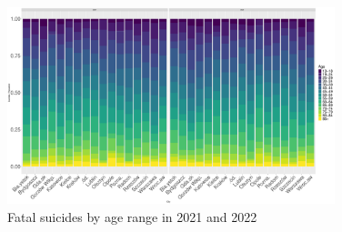 \documentclass{article}
\begin{document}
\begin{figure}[H]
    \centering
    \includegraphics[width=0.85\textwidth]{imgs/age_city_fat_op-2122.pdf}
    \caption{Fatal suicides by age range in 2021 and 2022}
    \label{fig:age_city_fat_op-2122}
\end{figure}
\end{document}

